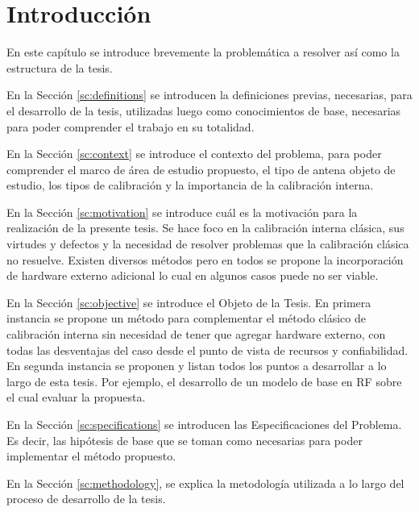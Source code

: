 
\chapter{Introducción} %

\label{ch:introduccion} %

En este capítulo se introduce brevemente la problemática a resolver así como la estructura de la tesis.

En la Sección \ref{sc:definitions} se introducen la definiciones previas, necesarias, para el desarrollo de la tesis, utilizadas
luego como conocimientos de base, necesarias para poder comprender el trabajo en su totalidad.

En la Sección \ref{sc:context} se introduce el contexto del problema, para poder comprender el marco de área de estudio
propuesto, el tipo de antena objeto de estudio, los tipos de calibración y la importancia de la calibración interna.

En la Sección \ref{sc:motivation} se introduce cuál es la motivación para la realización de la presente tesis. Se hace foco
en la calibración interna clásica, sus virtudes y defectos y la necesidad de resolver problemas que la calibración clásica no
resuelve. Existen diversos métodos pero en todos se propone la incorporación de hardware externo adicional lo cual en algunos 
casos puede no ser viable.

En la Sección \ref{sc:objective} se introduce el Objeto de la Tesis. En primera instancia se propone un método para 
complementar el método clásico de calibración interna sin necesidad de tener que agregar hardware externo, con todas las 
desventajas del caso desde el punto de vista de recursos y confiabilidad. En segunda instancia se proponen y listan todos los 
puntos a desarrollar a lo largo de esta tesis. Por ejemplo, el desarrollo de un modelo de base en RF sobre el cual evaluar la 
propuesta.

En la Sección \ref{sc:specifications} se introducen las Especificaciones del Problema. Es decir, las hipótesis de base que se
toman como necesarias para poder implementar el método propuesto.

En la Sección \ref{sc:methodology}, se explica la metodología utilizada a lo largo del proceso de desarrollo de la tesis.

